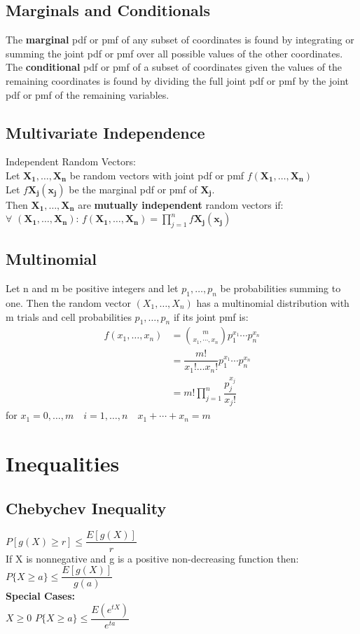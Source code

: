\documentclass[openany]{book}
\begin{document}
\begin{flushleft}
\section{Marginals and Conditionals}
The \textbf{marginal} pdf or pmf of any subset of coordinates is found by integrating or summing the joint pdf or pmf over all possible values of the other coordinates.\medbreak
The \textbf{conditional} pdf or pmf of a subset of coordinates given the values of the remaining coordinates is found by dividing the full joint pdf or pmf by the joint pdf or pmf of the remaining variables.
\section{Multivariate Independence}
Independent Random Vectors:\\
Let $\boldsymbol{X_1},\dots,\boldsymbol{X_n}$ be random vectors with joint pdf or pmf $f(\boldsymbol{X_1},\dots,\boldsymbol{X_n})$\\
Let $f\boldsymbol{X_j}(\boldsymbol{x_j})$ be the marginal pdf or pmf of $\boldsymbol{X_j}$.\\
Then $\boldsymbol{X_1},\dots,\boldsymbol{X_n}$ are \textbf{mutually independent} random vectors if:\\
$\forall$ $(\boldsymbol{X_1},\dots,\boldsymbol{X_n})$: \quad  $f(\boldsymbol{X_1},\dots,\boldsymbol{X_n})=\prod_{j=1}^{n}f\boldsymbol{X_j}(\boldsymbol{x_j})$
\section{Multinomial}
Let n and m be positive integers and let $p_1,\dots,p_n$ be probabilities summing to one. Then the random vector $(X_1,\dots,X_n)$ has a multinomial distribution with m trials and cell probabilities $p_1,\dots,p_n$ if its joint pmf is:
\begin{align*}
f(x_1,\dots,x_n)&={m \choose x_1,\cdots,x_n} p_1^{x_1}\cdots p_n^{x_n}\\
&=\dfrac{m!}{x_1! \dots x_n!}p_1^{x_1}\cdots p_n^{x_n}\\
&= m!\prod_{j=1}^{n}\dfrac{p_j^{x_j}}{x_j!}
\end{align*}
for $x_1=0,\dots,m \quad i=1,\dots,n \quad x_1+\cdots+x_n=m$
\chapter{Inequalities}
\section{Chebychev Inequality}
$P[g(X)\geq r] \leq \dfrac{E[g(X)]}{r}$\\
If X is nonnegative and g is a positive non-decreasing function then:\\
$P\{X\geq a \}\leq \dfrac{E[g(X)]}{g(a)}$\\
\textbf{Special Cases:}\\
$X\geq 0$ \quad $P\{X\geq a \}\leq \dfrac{E(e^{tX})}{e^{ta}}$\\

\end{flushleft}
\end{document}

